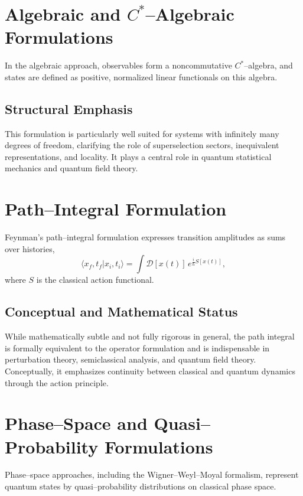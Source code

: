 \documentclass[11pt]{article}
\begin{document}
\section{Algebraic and $C^*$--Algebraic Formulations}

In the algebraic approach, observables form a noncommutative $C^*$--algebra, and states are defined as positive, normalized linear functionals on this algebra.

\subsection{Structural Emphasis}

This formulation is particularly well suited for systems with infinitely many degrees of freedom, clarifying the role of superselection sectors, inequivalent representations, and locality. It plays a central role in quantum statistical mechanics and quantum field theory.

\section{Path--Integral Formulation}

Feynman’s path--integral formulation expresses transition amplitudes as sums over histories,
\begin{equation}
 \langle x_f,t_f | x_i,t_i \rangle
 = \int \mathcal{D}[x(t)]\, e^{\frac{i}{\hbar} S[x(t)]},
\end{equation}
where $S$ is the classical action functional.

\subsection{Conceptual and Mathematical Status}

While mathematically subtle and not fully rigorous in general, the path integral is formally equivalent to the operator formulation and is indispensable in perturbation theory, semiclassical analysis, and quantum field theory. Conceptually, it emphasizes continuity between classical and quantum dynamics through the action principle.

\section{Phase--Space and Quasi--Probability Formulations}

Phase--space approaches, including the Wigner--Weyl--Moyal formalism, represent quantum states by quasi--probability distributions on classical phase space.
\end{document}

